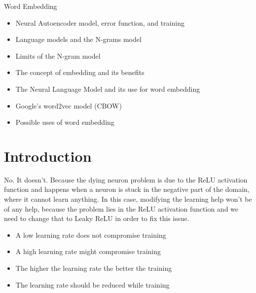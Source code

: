 Word Embedding
\begin{itemize}
    \item Neural Autoencoder model, error function, and training
    \item Language models and the N-grams model
    \item Limits of the N-gram model
    \item The concept of embedding and its benefits
    \item The Neural Language Model and its use for word embedding
    \item Google’s word2vec model (CBOW)
    \item Possible uses of word embedding
\end{itemize}

\section{Introduction}


\begin{box-stud}
    No. It doesn't. Because the dying neuron problem is due to the ReLU activation function and happens when a neuron is stuck in the negative part of the domain, where it cannot learn anything. In this case, modifying the learning help won't be of any help, because the problem lies in the ReLU activation function and we need to change that to Leaky ReLU in order to fix this issue.
\end{box-stud}


\begin{box-sol}
    \begin{itemize}[label=]
        \item A low learning rate does not compromise training
        \item[\ok] A high learning rate might compromise training
        \item The higher the learning rate the better the training
        \item[\ok] The learning rate should be reduced while training
    \end{itemize}
\end{box-sol}

